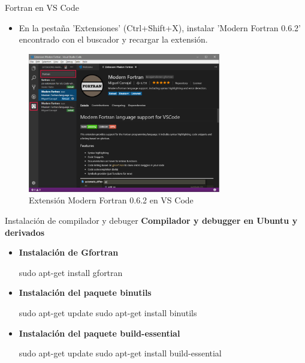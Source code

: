 \begin{frame}[fragile]{Fortran en VS Code}
  \begin{itemize}
   \item  En la pestaña 'Extensiones' (Ctrl+Shift+X), instalar 'Modern Fortran 0.6.2' encontrado con el buscador y recargar la extensión. 
  \end{itemize}
   \begin{figure}
    \includegraphics[width=0.75\textwidth]{./resources/Moder_fortran.png}
    \caption*{Extensión Modern Fortran 0.6.2 en VS Code}
   \end{figure}
\end{frame}

\begin{frame}[fragile]{Instalación de compilador y debuger}
  \textbf{Compilador y debugger en Ubuntu y derivados}
\begin{itemize}[<+(1)->] 
\item \textbf{Instalación de Gfortran}
    \begin{mintedbash} 
       sudo apt-get install gfortran
    \end{mintedbash}
  \item	\textbf{Instalación del paquete binutils}
    \begin{mintedbash}
       sudo apt-get update
       sudo apt-get install binutils
    \end{mintedbash}
\item	\textbf{Instalación del paquete build-essential}
    \begin{mintedbash}
       sudo apt-get update
       sudo apt-get install build-essential
  	\end{mintedbash}
\end{itemize}
\end{frame}



